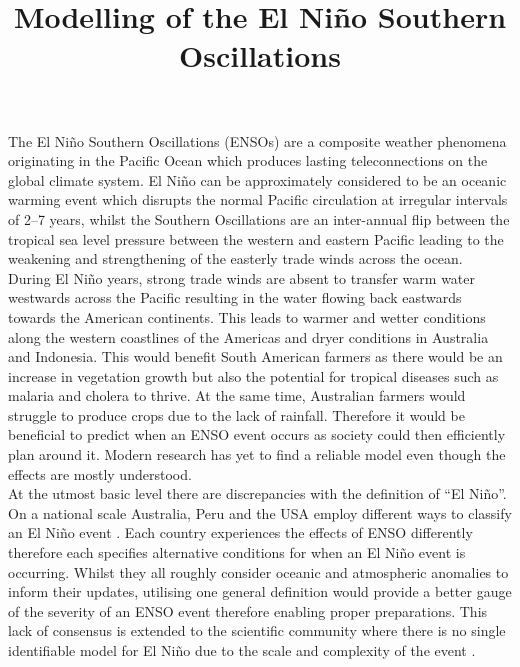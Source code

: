 \documentclass[12pt, onecolumn]{revtex4}    %
\begin{document}
                     

\title{Modelling of the El Ni\~{n}o Southern Oscillations} 

\maketitle
\thispagestyle{plain} %

The El Ni\~{n}o Southern Oscillations (ENSOs) are a composite weather phenomena originating in the Pacific Ocean which produces lasting teleconnections on the global climate system. El Ni\~{n}o can be approximately considered to be an oceanic warming event which disrupts the normal Pacific circulation at irregular intervals of 2--7 years, whilst the Southern Oscillations are an inter-annual flip between the tropical sea level pressure between the western and eastern Pacific leading to the weakening and strengthening of the easterly trade winds across the ocean. \\

During El Ni\~{n}o years, strong trade winds are absent to transfer warm water westwards across the Pacific resulting in the water flowing back eastwards towards the American continents. This leads to warmer and wetter conditions along the western coastlines of the Americas and dryer conditions in Australia and Indonesia. This would benefit South American farmers as there would be an increase in vegetation growth but also the potential for tropical diseases such as malaria and cholera to thrive. At the same time, Australian farmers would struggle to produce crops due to the lack of rainfall. Therefore it would be beneficial to predict when an ENSO event occurs as society could then efficiently plan around it. Modern research has yet to find a reliable model even though the effects are mostly understood. \\

At the utmost basic level there are discrepancies with the definition of ``El Ni\~{n}o''. On a national scale Australia, Peru and the USA employ different ways to classify an El Ni\~{n}o event \citep{doi:10.1175/BAMS-D-16-0009.1}. Each country experiences the effects of ENSO differently therefore each specifies alternative conditions for when an El Ni\~{n}o event is occurring. Whilst they all roughly consider oceanic and atmospheric anomalies to inform their updates, utilising one general definition would provide a better gauge of the severity of an ENSO event therefore enabling proper preparations. This lack of consensus is extended to the scientific community where there is no single identifiable model for El Ni\~{n}o due to the scale and complexity of the event \citep{1997BAMS...78.2771T}. \\
\end{document}
